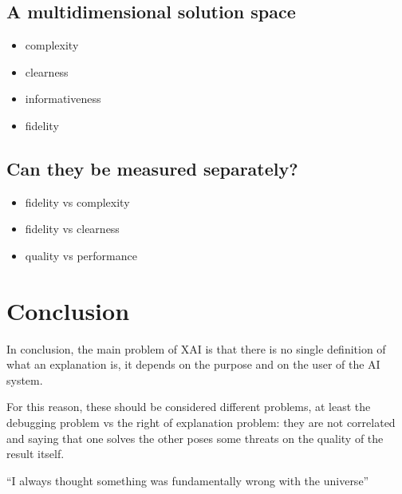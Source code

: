 \documentclass{article}
\begin{document}
\subsection{A multidimensional solution space}

\begin{itemize}
    \item complexity
    \item clearness
    \item informativeness
    \item fidelity
\end{itemize}

\subsection{Can they be measured separately?}

\begin{itemize}
    \item fidelity vs complexity
    \item fidelity vs clearness
    \item quality vs performance
\end{itemize}

\section{Conclusion}

In conclusion, the main problem of XAI is that there is no single definition of what an explanation is, it depends on the purpose and on the user of the AI system.

For this reason, these should be considered different problems, at least the debugging problem vs the right of explanation problem: they are not correlated and saying that one solves the other poses some threats on the quality of the result itself.

``I always thought something was fundamentally wrong with the universe''
\citep{adams1995hitchhiker}



\end{document}

